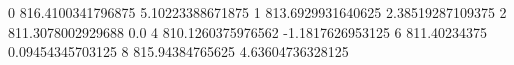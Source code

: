 0 816.4100341796875 5.10223388671875
1 813.6929931640625 2.38519287109375
2 811.3078002929688 0.0
4 810.1260375976562 -1.1817626953125
6 811.40234375 0.09454345703125
8 815.94384765625 4.63604736328125
